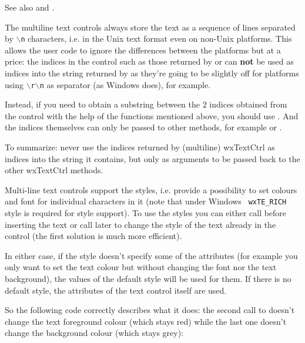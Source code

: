 See also  and .


The multiline text controls always store the text as a sequence of lines
separated by {\tt $\backslash$n} characters, i.e. in the Unix text format even
on non-Unix platforms. This allows the user code to ignore the differences
between the platforms but at a price: the indices in the control such as those
returned by  or
 can {\bf not} be used as
indices into the string returned by  as
they're going to be slightly off for platforms using
{\tt $\backslash$r$\backslash$n} as separator (as Windows does), for example.

Instead, if you need to obtain a substring between the $2$ indices obtained
from the control with the help of the functions mentioned above, you should
use . And the indices themselves can
only be passed to other methods, for example
 or
.

To summarize: never use the indices returned by (multiline) wxTextCtrl as
indices into the string it contains, but only as arguments to be passed back
to the other wxTextCtrl methods.


Multi-line text controls support the styles, i.e. provide a possibility to set
colours and font for individual characters in it (note that under Windows {\tt
wxTE\_RICH} style is required for style support). To use the styles you can
either call  before
inserting the text or call  later to
change the style of the text already in the control (the first solution is
much more efficient).

In either case, if the style doesn't specify some of the attributes (for
example you only want to set the text colour but without changing the font nor
the text background), the values of the default style will be used for them.
If there is no default style, the attributes of the text control itself are
used.

So the following code correctly describes what it does: the second call
to  doesn't change the
text foreground colour (which stays red) while the last one doesn't change the
background colour (which stays grey):


